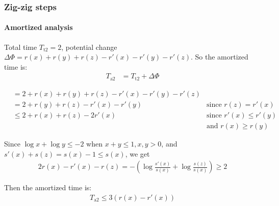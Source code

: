 \documentclass{beamer}
\theoremstyle{plain}
\begin{document}
    \begin{frame}
        \frametitle{Zig-zig steps}
        \framesubtitle{Amortized analysis}
    
        \begin{figure}
            \centering
        \end{figure}
    
        Total time $T_\mathrm{t2} = 2$, potential change $\Delta\varPhi = r(x) + r(y) + r(z) - r'(x) - r'(y) -r'(z)$. So the amortized time is: \pause
        \begin{align*}
            T_\mathrm{a2} &= T_\mathrm{t2} + \Delta\varPhi
        \end{align*}
    \end{frame}

    \begin{frame}
    
        \begin{align*}
            &= 2 + r(x) + r(y) + r(z) - r'(x) - r'(y) - r'(z) \\
            &= 2 + r(y) + r(z) - r'(x) - r'(y) & \text{since } r(z) = r'(x) \\
            &\leq 2 + r(x) + r(z) - 2r'(x) & \text{since } r'(x) \leq r'(y) \\
            &                              & \text{and } r(x) \geq r(y)
        \end{align*}

        Since $\log x + \log y \leq -2$ when $x + y \leq 1, x,y > 0$, and $s'(x) + s(z) = s(x) - 1 \leq s(x)$, we get
        \begin{align*}
            2r(x) - r'(x) - r(z) = -(\log \frac{s'(x)}{s(x)} + \log \frac{s(z)}{s(x)}) \geq  2
        \end{align*}

        Then the amortized time is:
        \begin{align*}
            T_\mathrm{a2} \leq 3(r(x) - r'(x))
        \end{align*}
    
    \end{frame}
\end{document}
